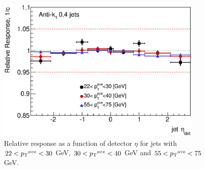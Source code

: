 \begin{figure}
\centering
\includegraphics[width=0.9\textwidth]{figures/JetPerformance/2011/ResponseAvePtComp.eps}
\caption[Relative response as a function of $\eta$]{
Relative response as a function of detector $\eta$ for jets with $22<\mbox{$\mbox{$p_{\rm T}$}{}^{ave}$}{}<30$ GeV, $30<\mbox{$\mbox{$p_{\rm T}$}{}^{ave}$}{}<40$ GeV and $55<\mbox{$\mbox{$p_{\rm T}$}{}^{ave}$}{}<75$ GeV.
\label{JetPerf:PtComp}}
\end{figure}


